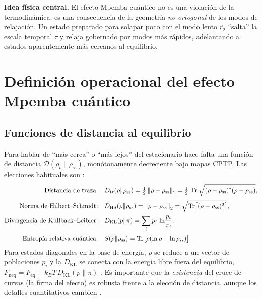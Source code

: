 \documentclass[11pt,a4paper]{article}
\theoremstyle{definition}
\theoremstyle{plain}
\newcommand{\Dop}{\mathcal{D}}
\newcommand{\rss}{\rho_{\mathrm{ss}}}
\renewcommand{\Tr}{\operatorname{Tr}}
\begin{document}
\begin{cajaclave}
\textbf{Idea física central.} El efecto Mpemba cuántico no es una violación de la termodinámica: es una
consecuencia de la geometría \emph{no ortogonal} de los modos de relajación. Un estado preparado para
solapar poco con el modo lento $\hat r_2$ ``salta'' la escala temporal $\tau$ y relaja gobernado por modos
más rápidos, adelantando a estados aparentemente más cercanos al equilibrio.
\end{cajaclave}

\section{Definición operacional del efecto Mpemba cuántico}

\subsection{Funciones de distancia al equilibrio}

Para hablar de ``más cerca'' o ``más lejos'' del estacionario hace falta una función de distancia
$\Dop(\rho_t\|\rss)$, monótonamente decreciente bajo mapas CPTP. Las elecciones habituales son
\cite{KumarBechhoefer2020,LiYang2026,Alyuruk2025}:
\begin{align}
\text{Distancia de traza:}\quad & D_{\mathrm{tr}}(\rho\|\rss)=\tfrac12\,\norm{\rho-\rss}_1
=\tfrac12\,\Tr\sqrt{(\rho-\rss)^{\dagger}(\rho-\rss)},\\[2pt]
\text{Norma de Hilbert--Schmidt:}\quad & D_{\mathrm{HS}}(\rho\|\rss)=\norm{\rho-\rss}_2
=\sqrt{\Tr\!\big[(\rho-\rss)^2\big]},\\[2pt]
\text{Divergencia de Kullback--Leibler:}\quad & D_{\mathrm{KL}}(p\|\pi)=\sum_i p_i\,\ln\!\frac{p_i}{\pi_i},\\[2pt]
\text{Entropía relativa cuántica:}\quad & S(\rho\|\rss)=\Tr\!\big[\rho(\ln\rho-\ln\rss)\big].
\end{align}
Para estados diagonales en la base de energía, $\rho$ se reduce a un vector de poblaciones $p_i$ y la
$D_{\mathrm{KL}}$ se conecta con la energía libre fuera del equilibrio,
$F_{\mathrm{neq}}=F_{\mathrm{eq}}+k_BT\,D_{\mathrm{KL}}(p\|\pi)$
\cite{KumarBechhoefer2020}. Es importante que la \emph{existencia} del cruce de curvas (la firma del
efecto) es robusta frente a la elección de distancia, aunque los detalles cuantitativos cambien
\cite{KumarBechhoefer2020}.
\end{document}
